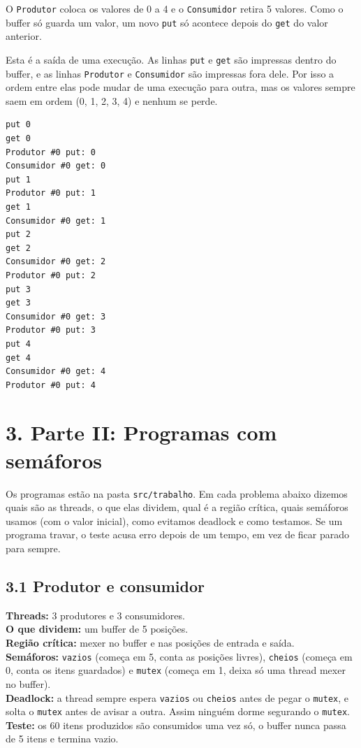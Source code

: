 \documentclass[12pt,a4paper]{article}
\begin{document}
O \texttt{Produtor} coloca os valores de 0 a 4 e o \texttt{Consumidor} retira 5 valores. Como o buffer só guarda
um valor, um novo \texttt{put} só acontece depois do \texttt{get} do valor anterior.

Esta é a saída de uma execução. As linhas \texttt{put} e \texttt{get} são impressas dentro do buffer, e as linhas
\texttt{Produtor} e \texttt{Consumidor} são impressas fora dele. Por isso a ordem entre elas pode mudar de uma
execução para outra, mas os valores sempre saem em ordem (0, 1, 2, 3, 4) e nenhum se perde.
\begin{small}
\begin{Verbatim}[frame=single]
put 0
get 0
Produtor #0 put: 0
Consumidor #0 get: 0
put 1
Produtor #0 put: 1
get 1
Consumidor #0 get: 1
put 2
get 2
Consumidor #0 get: 2
Produtor #0 put: 2
put 3
get 3
Consumidor #0 get: 3
Produtor #0 put: 3
put 4
get 4
Consumidor #0 get: 4
Produtor #0 put: 4
\end{Verbatim}
\end{small}

\section*{3. Parte II: Programas com semáforos}
Os programas estão na pasta \texttt{src/trabalho}. Em cada problema abaixo dizemos quais são as threads, o que elas
dividem, qual é a região crítica, quais semáforos usamos (com o valor inicial), como evitamos deadlock e como
testamos. Se um programa travar, o teste acusa erro depois de um tempo, em vez de ficar parado para sempre.

\subsection*{3.1 Produtor e consumidor}
\textbf{Threads:} 3 produtores e 3 consumidores.\\
\textbf{O que dividem:} um buffer de 5 posições.\\
\textbf{Região crítica:} mexer no buffer e nas posições de entrada e saída.\\
\textbf{Semáforos:} \texttt{vazios} (começa em 5, conta as posições livres), \texttt{cheios} (começa em 0, conta os
itens guardados) e \texttt{mutex} (começa em 1, deixa só uma thread mexer no buffer).\\
\textbf{Deadlock:} a thread sempre espera \texttt{vazios} ou \texttt{cheios} antes de pegar o \texttt{mutex}, e solta
o \texttt{mutex} antes de avisar a outra. Assim ninguém dorme segurando o \texttt{mutex}.\\
\textbf{Teste:} os 60 itens produzidos são consumidos uma vez só, o buffer nunca passa de 5 itens e termina vazio.
\end{document}
